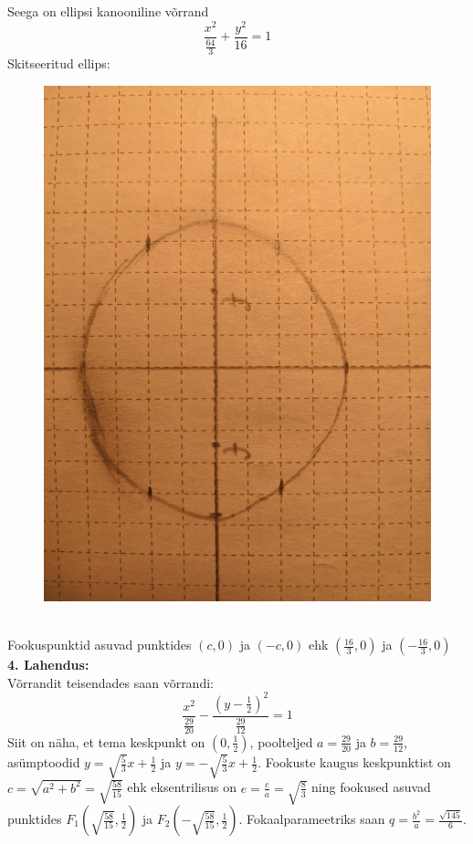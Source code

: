 \documentclass{article}
\begin{document}
Seega on ellipsi kanooniline võrrand $$\frac{x^2}{\frac{64}{3}}+\frac{y^2}{16}=1$$
Skitseeritud ellips:\\
\begin{figure}[htbp]
\centerline{\includegraphics[scale=0.2,angle=90]{ellips.jpg}}
\end{figure}\\
Fookuspunktid asuvad punktides $(c,0)$ ja $(-c,0)$ ehk $(\frac{16}3,0)$ ja $(-\frac{16}3,0)$
\pagebreak\\
\textbf{4. Lahendus:}\\
Võrrandit teisendades saan võrrandi: $$\frac{x^2}{\frac{29}{20}}-\frac{(y-\frac12)^2}{\frac{29}{12}}=1$$ Siit on näha, et tema keskpunkt on $\left(0,\frac12\right)$, poolteljed $a=\frac{29}{20}$ ja $b=\frac{29}{12}$, asümptoodid $y=\sqrt{\frac{5}{3}}x+\frac12$ ja $y=-\sqrt{\frac{5}{3}}x+\frac12$. Fookuste kaugus keskpunktist on $c=\sqrt{a^2+b^2}=\sqrt{\frac{58}{15}}$ ehk eksentrilisus on $e=\frac{c}{a}=\sqrt{\frac83}$ ning fookused asuvad punktides $F_1\left(\sqrt{\frac{58}{15}},\frac12\right)$ ja $F_2\left(-\sqrt{\frac{58}{15}},\frac12\right)$. Fokaalparameetriks saan $q=\frac{b^2}{a}=\frac{\sqrt{145}}{6}$.\\
\end{document}

